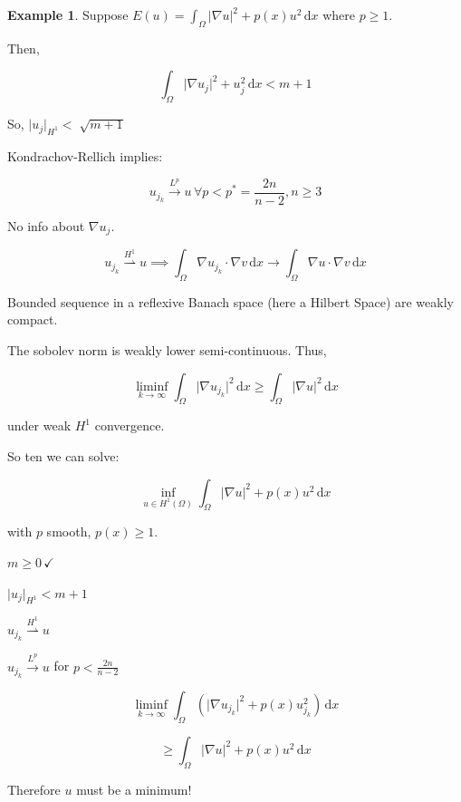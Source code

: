 \documentclass{article}
\theoremstyle{definition}
\newtheorem{example}{Example}
\begin{document}
\begin{example}
    Suppose \(E(u) = \int_{\Omega} \vert \nabla u \vert ^2 + p(x)u^2\,\mathrm{d}x\) where \(p \geq 1\).
    
    Then,

    \[
        \int_{\Omega} \vert \nabla u_j \vert ^2+ u_j^2 \,\mathrm{d}x < m+1
    \]

    So, \(\vert u_j \vert_{H^1} < \sqrt[]{m+1} \)
    
    Kondrachov-Rellich implies:

    \[
        u_{j_k} \overset{L^p}{\to} u \, \forall p < p^{\ast} = \frac{2n}{n-2}, n \geq 3
    \]

    No info about \(\nabla u_j\).

    \[
        u_{j_k} \overset{H^1}{\rightharpoonup} u \implies \int_{\Omega} \nabla u_{j_k} \cdot \nabla v \,\mathrm{d}x \to \int_{\Omega} \nabla u \cdot \nabla v \,\mathrm{d}x 
    \]


    Bounded sequence in a reflexive Banach space (here a Hilbert Space) are weakly compact.

    The sobolev norm is weakly lower semi-continuous. Thus,

    \[
        \liminf_{k \to \infty} \int_{\Omega} \vert \nabla u_{j_k} \vert ^ 2 \,\mathrm{d}x \geq \int_{\Omega} \vert \nabla u \vert ^ 2 \,\mathrm{d}x 
    \]

    under weak \(H^1\) convergence.

    So ten we can solve:

    \[
        \inf_{u\in H^1(\Omega)} \int_{\Omega} \vert \nabla u \vert ^ 2 + p(x)u^2 \,\mathrm{d}x 
    \]

    with \(p\) smooth, \(p(x) \geq 1\).

    \(m \geq 0 \, \checkmark\)

    \(\vert u_j \vert_{H^1} < m+1\) 

    \(u_{j_k} \overset{H^1}{\rightharpoonup} u\) 

    \(u_{j_k} \overset{L^p}{\to} u\) for \(p < \frac{2n}{n-2}\) 

    \[
        \liminf_{k \to \infty} \int_{\Omega} \left( \vert \nabla u_{j_k}  \vert ^2 + p(x) u_{j_k} ^2 \right)  \,\mathrm{d}x 
    \]

    \[
        \geq \int_{\Omega} \vert \nabla u \vert ^2 + p(x) u^2 \,\mathrm{d}x 
    \]

    Therefore \(u\) must be a minimum!

\end{example}
\end{document}
